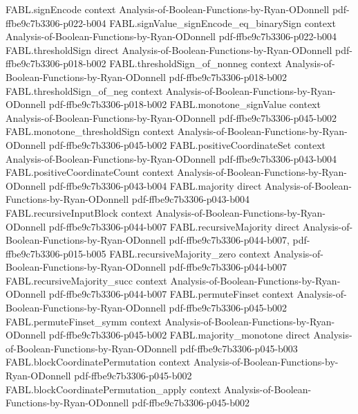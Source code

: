 \begin{theorem}
\proofstep
  {FABL.signEncode}
  {context}
  {Analysis-of-Boolean-Functions-by-Ryan-ODonnell}
  {pdf-ffbe9c7b3306-p022-b004}
\proofstep
  {FABL.signValue_signEncode_eq_binarySign}
  {context}
  {Analysis-of-Boolean-Functions-by-Ryan-ODonnell}
  {pdf-ffbe9c7b3306-p022-b004}
\proofstep
  {FABL.thresholdSign}
  {direct}
  {Analysis-of-Boolean-Functions-by-Ryan-ODonnell}
  {pdf-ffbe9c7b3306-p018-b002}
\proofstep
  {FABL.thresholdSign_of_nonneg}
  {context}
  {Analysis-of-Boolean-Functions-by-Ryan-ODonnell}
  {pdf-ffbe9c7b3306-p018-b002}
\proofstep
  {FABL.thresholdSign_of_neg}
  {context}
  {Analysis-of-Boolean-Functions-by-Ryan-ODonnell}
  {pdf-ffbe9c7b3306-p018-b002}
\proofstep
  {FABL.monotone_signValue}
  {context}
  {Analysis-of-Boolean-Functions-by-Ryan-ODonnell}
  {pdf-ffbe9c7b3306-p045-b002}
\proofstep
  {FABL.monotone_thresholdSign}
  {context}
  {Analysis-of-Boolean-Functions-by-Ryan-ODonnell}
  {pdf-ffbe9c7b3306-p045-b002}
\proofstep
  {FABL.positiveCoordinateSet}
  {context}
  {Analysis-of-Boolean-Functions-by-Ryan-ODonnell}
  {pdf-ffbe9c7b3306-p043-b004}
\proofstep
  {FABL.positiveCoordinateCount}
  {context}
  {Analysis-of-Boolean-Functions-by-Ryan-ODonnell}
  {pdf-ffbe9c7b3306-p043-b004}
\proofstep
  {FABL.majority}
  {direct}
  {Analysis-of-Boolean-Functions-by-Ryan-ODonnell}
  {pdf-ffbe9c7b3306-p043-b004}
\proofstep
  {FABL.recursiveInputBlock}
  {context}
  {Analysis-of-Boolean-Functions-by-Ryan-ODonnell}
  {pdf-ffbe9c7b3306-p044-b007}
\proofstep
  {FABL.recursiveMajority}
  {direct}
  {Analysis-of-Boolean-Functions-by-Ryan-ODonnell}
  {pdf-ffbe9c7b3306-p044-b007,
    pdf-ffbe9c7b3306-p015-b005}
\proofstep
  {FABL.recursiveMajority_zero}
  {context}
  {Analysis-of-Boolean-Functions-by-Ryan-ODonnell}
  {pdf-ffbe9c7b3306-p044-b007}
\proofstep
  {FABL.recursiveMajority_succ}
  {context}
  {Analysis-of-Boolean-Functions-by-Ryan-ODonnell}
  {pdf-ffbe9c7b3306-p044-b007}
\proofstep
  {FABL.permuteFinset}
  {context}
  {Analysis-of-Boolean-Functions-by-Ryan-ODonnell}
  {pdf-ffbe9c7b3306-p045-b002}
\proofstep
  {FABL.permuteFinset_symm}
  {context}
  {Analysis-of-Boolean-Functions-by-Ryan-ODonnell}
  {pdf-ffbe9c7b3306-p045-b002}
\proofstep
  {FABL.majority_monotone}
  {direct}
  {Analysis-of-Boolean-Functions-by-Ryan-ODonnell}
  {pdf-ffbe9c7b3306-p045-b003}
\proofstep
  {FABL.blockCoordinatePermutation}
  {context}
  {Analysis-of-Boolean-Functions-by-Ryan-ODonnell}
  {pdf-ffbe9c7b3306-p045-b002}
\proofstep
  {FABL.blockCoordinatePermutation_apply}
  {context}
  {Analysis-of-Boolean-Functions-by-Ryan-ODonnell}
  {pdf-ffbe9c7b3306-p045-b002}
\proofstep

\end{theorem}
